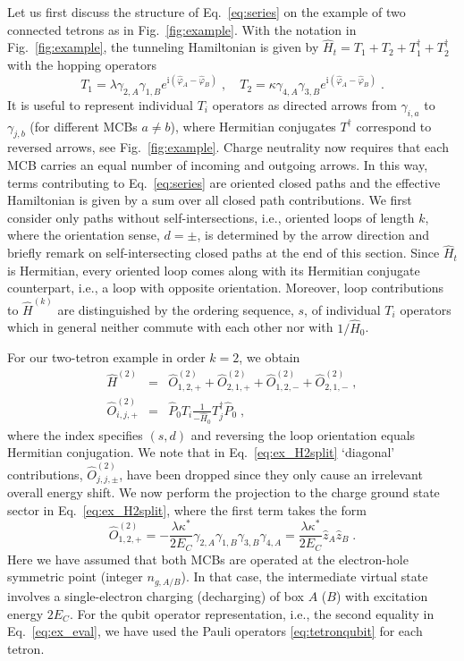 \documentclass[twocolumn,floats,prx,showpacs]{revtex4-1}
\begin{document}
Let us first discuss the structure of Eq.~\eqref{eq:series} on the example of two connected tetrons as in Fig.~\ref{fig:example}. With the notation in Fig.~\ref{fig:example}, the tunneling Hamiltonian is given by  
$\hat H_t= T_1+ T_2 + T_1^\dagger +T_2^\dagger$ with the hopping operators
\begin{equation}
T_1=\lambda \gamma_{2,A} \gamma_{1,B} e^{\mathrm i (\hat\varphi_A-\hat\varphi_B)}\;,  \quad \label{eq:T12}
T_2=\kappa \gamma_{4,A} \gamma_{3,B} e^{\mathrm i (\hat\varphi_A-\hat\varphi_B)}\;.
\end{equation} 
It is useful to represent individual $T_i$ operators as directed arrows from $\gamma_{i,a}$ to $\gamma_{j,b}$ (for different MCBs $a\ne b$), where Hermitian conjugates $T^\dagger$ correspond to reversed arrows, see Fig.~\ref{fig:example}.  
Charge neutrality now requires that each MCB carries an equal number of incoming and outgoing arrows. In this way, terms contributing to Eq.~\eqref{eq:series} are oriented closed paths and the effective Hamiltonian is given by a sum over all closed path contributions.  We first consider only paths without self-intersections, i.e., oriented loops of length $k$, where the orientation sense, $d=\pm$, is determined by the arrow direction and briefly remark on self-intersecting closed paths at the end of this section. Since $\hat H_t$ is Hermitian, every oriented loop comes along with its Hermitian conjugate counterpart, i.e., a loop  with opposite orientation. Moreover, loop contributions to $\hat H^{(k)}$ are distinguished by the ordering sequence, $s$, of individual $T_i$ operators which in general neither commute with each other nor with $1/\hat H_0$. 


For our two-tetron example in order $k=2$, we obtain 
\begin{eqnarray} 
\hat H^{(2)}&=& \hat O^{(2)}_{1,2,+}+\hat O^{(2)}_{2,1,+}+\hat O^{(2)}_{1,2,-}+\hat O^{(2)}_{2,1,-}\;, 
\label{eq:ex_H2split} \\ \nonumber
\hat O_{i,j,+}^{(2)}&=&\hat P_0 T_i \frac{1}{-\hat H_0} T_j^\dagger \hat P_0\;,
\end{eqnarray}
where the index specifies $(s,d)$ and reversing the loop orientation equals Hermitian conjugation. 
We note that in Eq.~\eqref{eq:ex_H2split} `diagonal' contributions, $\hat O_{j,j,\pm}^{(2)}$, have been dropped since they only cause an irrelevant overall energy shift.  We now perform the projection to the charge ground state sector in Eq.~\eqref{eq:ex_H2split}, where the first term takes the form
\begin{equation}\label{eq:ex_eval} 
\hat O^{(2)}_{1,2,+}= -\frac{\lambda \kappa^\ast}{2 E_C} \gamma_{2,A} \gamma_{1,B} \gamma_{3,B}\gamma_{4,A} = \frac{\lambda \kappa^\ast}{2 E_C} \hat z_A \hat z_B\;.
\end{equation}
Here we have assumed that both MCBs are operated at the
electron-hole symmetric point (integer $n_{g,A/B}$). In that case, the intermediate virtual state involves a single-electron charging (decharging) of box $A$ ($B$) with excitation energy $2E_C$. For the qubit operator representation, i.e., the second equality in Eq.~\eqref{eq:ex_eval}, we have used the Pauli operators \eqref{eq:tetronqubit} for each tetron.
\end{document}
